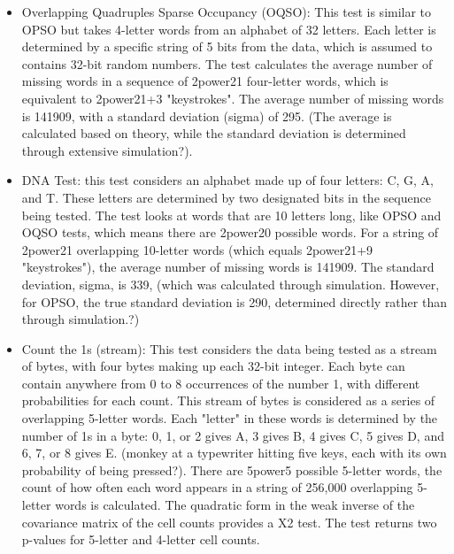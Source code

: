 \begin{itemize}
\item Overlapping Quadruples Sparse Occupancy (OQSO): This test is similar to OPSO but takes 4-letter words from an alphabet of 32 letters.  Each letter is determined by a specific string of 5 bits from the data, which is assumed to contains 32-bit random numbers. The test calculates the average number of missing words in a sequence of 2power21 four-letter words, which is equivalent to 2power21+3 "keystrokes". The average number of missing words is 141909, with a standard deviation (sigma) of 295. (The average is calculated based on theory, while the standard deviation is determined through extensive simulation?).
\item DNA Test: this test considers an alphabet made up of four letters: C, G, A, and T. These letters are determined by two designated bits in the sequence being tested. The test looks at words that are 10 letters long, like OPSO and OQSO tests, which means there are 2power20 possible words. For a string of 2power21 overlapping 10-letter words (which equals 2power21+9 "keystrokes"), the average number of missing words is 141909. The standard deviation, sigma, is 339, (which was calculated through simulation. However, for OPSO, the true standard deviation is 290, determined directly rather than through simulation.?)
\item Count the 1s (stream): This test considers the data being tested as a stream of bytes, with four bytes making up each 32-bit integer. Each byte can contain anywhere from 0 to 8 occurrences of the number 1, with different probabilities for each count. This stream of bytes is considered as a series of overlapping 5-letter words. Each "letter" in these words is determined by the number of 1s in a byte: 0, 1, or 2 gives A, 3 gives B, 4 gives C, 5 gives D, and 6, 7, or 8 gives E. (monkey at a typewriter hitting five keys, each with its own probability of being pressed?). There are 5power5 possible 5-letter words, the count of how often each word appears in a string of 256,000 overlapping 5-letter words is calculated. The quadratic form in the weak inverse of the covariance matrix of the cell counts provides a X2 test. The test returns two p-values for 5-letter and 4-letter cell counts.

\end{itemize}
